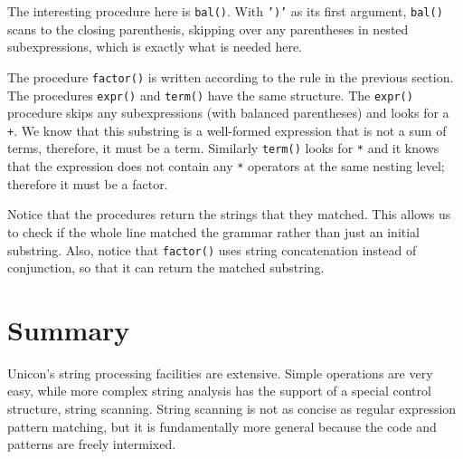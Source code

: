 The interesting procedure here is \texttt{bal()}. With
\texttt{')'} as its first argument,
\texttt{bal()} scans to the closing parenthesis, skipping over any
parentheses in nested subexpressions, which is exactly what is needed
here.

The procedure \texttt{factor()} is written according to the rule in the
previous section. The procedures \texttt{expr()} and \texttt{term()}
have the same structure. The \texttt{expr()} procedure skips any
subexpressions (with balanced parentheses) and looks for a \texttt{+}.
We know that this substring is a well-formed expression that is not a
sum of terms, therefore, it must be a term. Similarly \texttt{term()}
looks for \texttt{*} and it knows that the expression does not contain
any \texttt{*} operators at the same nesting level; therefore it must
be a factor.

Notice that the procedures return the strings that they matched. This
allows us to check if the whole line matched the grammar rather than
just an initial substring. Also, notice that \texttt{factor()} uses
string concatenation instead of conjunction, so that it can return the
matched substring.

\section*{Summary}

Unicon's string processing facilities are extensive.
Simple operations are very easy, while more complex string analysis has
the support of a special control structure, string scanning. String
scanning is not as concise as regular expression pattern matching, but
it is fundamentally more general because the code and patterns are
freely intermixed.

